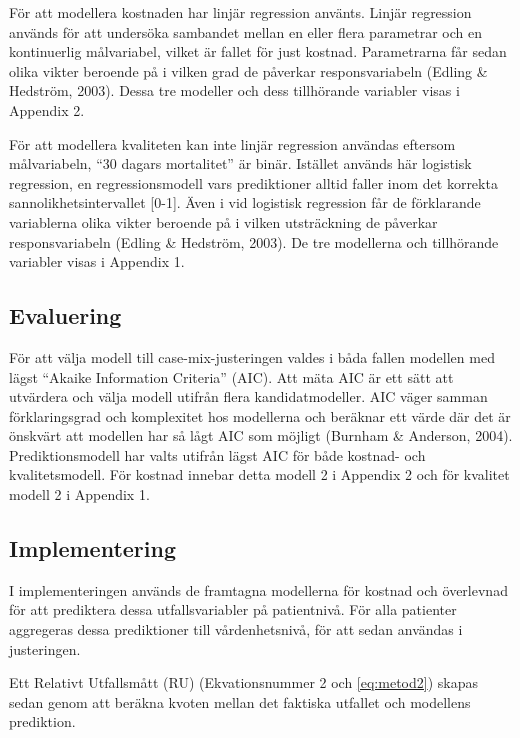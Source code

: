 För att modellera kostnaden har linjär regression använts. Linjär regression används för att undersöka sambandet mellan en eller flera parametrar och en kontinuerlig målvariabel, vilket är fallet för just kostnad. Parametrarna får sedan olika vikter beroende på i vilken grad de påverkar responsvariabeln (Edling \& Hedström, 2003). Dessa tre modeller och dess tillhörande variabler visas i Appendix 2.

För att modellera kvaliteten kan inte linjär regression användas eftersom målvariabeln, “30 dagars mortalitet” är binär. Istället används här logistisk regression, en regressionsmodell vars prediktioner alltid faller inom det korrekta sannolikhetsintervallet [0-1]. Även i vid logistisk regression får de förklarande variablerna olika vikter beroende på i vilken utsträckning de påverkar responsvariabeln (Edling \& Hedström, 2003). De tre modellerna och tillhörande variabler visas i Appendix 1. 

\subsection{Evaluering}

För att välja modell till case-mix-justeringen valdes i båda fallen modellen med lägst “Akaike Information Criteria” (AIC). Att mäta AIC är ett sätt att utvärdera och välja modell utifrån flera kandidatmodeller. AIC väger samman förklaringsgrad och komplexitet hos modellerna och beräknar ett värde där det är önskvärt att modellen har så lågt AIC som möjligt (Burnham \& Anderson, 2004). Prediktionsmodell har valts utifrån lägst AIC för både kostnad- och kvalitetsmodell. För kostnad innebar detta modell 2 i Appendix 2 och för kvalitet modell 2 i Appendix 1.

\subsection{Implementering}


I implementeringen används de framtagna modellerna för kostnad och överlevnad för att prediktera dessa utfallsvariabler på patientnivå. För alla patienter aggregeras dessa prediktioner till vårdenhetsnivå, för att sedan användas i justeringen. 

Ett Relativt Utfallsmått (RU) (Ekvationsnummer 2 och \ref{eq:metod2}) skapas sedan genom att beräkna kvoten mellan det faktiska utfallet och modellens prediktion.


